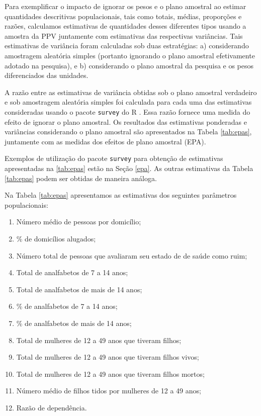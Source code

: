 \documentclass[]{book}
\providecommand{\tightlist}{%
  \setlength{\itemsep}{0pt}\setlength{\parskip}{0pt}}
\theoremstyle{definition}
\theoremstyle{definition}
\theoremstyle{definition}
\theoremstyle{remark}
\begin{document}
Para exemplificar o impacto de ignorar os pesos e o plano amostral ao
estimar quantidades descritivas populacionais, tais como totais, médias,
proporções e razões, calculamos estimativas de quantidades desses
diferentes tipos usando a amostra da PPV juntamente com estimativas das
respectivas variâncias. Tais estimativas de variância foram calculadas
sob duas estratégias: a) considerando amostragem aleatória simples
(portanto ignorando o plano amostral efetivamente adotado na pesquisa),
e b) considerando o plano amostral da pesquisa e os pesos diferenciados
das unidades.

A razão entre as estimativas de variância obtidas sob o plano amostral
verdadeiro e sob amostragem aleatória simples foi calculada para cada
uma das estimativas consideradas usando o pacote \texttt{survey} do R
\citep{R-survey}. Essa razão fornece uma medida do efeito de ignorar o
plano amostral. Os resultados das estimativas ponderadas e variâncias
considerando o plano amostral são apresentados na Tabela \ref{tab:epas},
juntamente com as medidas dos efeitos de plano amostral (EPA).

Exemplos de utilização do pacote \texttt{survey} para obtenção de
estimativas apresentadas na \ref{tab:epas} estão na Seção \ref{epa}. As
outras estimativas da Tabela \ref{tab:epas} podem ser obtidas de maneira
análoga.

Na Tabela \ref{tab:epas} apresentamos as estimativas dos seguintes
parâmetros populacionais:

\begin{enumerate}
\def\labelenumi{\arabic{enumi}.}
\tightlist
\item
  Número médio de pessoas por domicílio;
\item
  \% de domicílios alugados;
\item
  Número total de pessoas que avaliaram seu estado de de saúde como
  ruim;
\item
  Total de analfabetos de 7 a 14 anos;
\item
  Total de analfabetos de mais de 14 anos;
\item
  \% de analfabetos de 7 a 14 anos;
\item
  \% de analfabetos de mais de 14 anos;
\item
  Total de mulheres de 12 a 49 anos que tiveram filhos;
\item
  Total de mulheres de 12 a 49 anos que tiveram filhos vivos;
\item
  Total de mulheres de 12 a 49 anos que tiveram filhos mortos;
\item
  Número médio de filhos tidos por mulheres de 12 a 49 anos;
\item
  Razão de dependência.
\end{enumerate}
\end{document}
